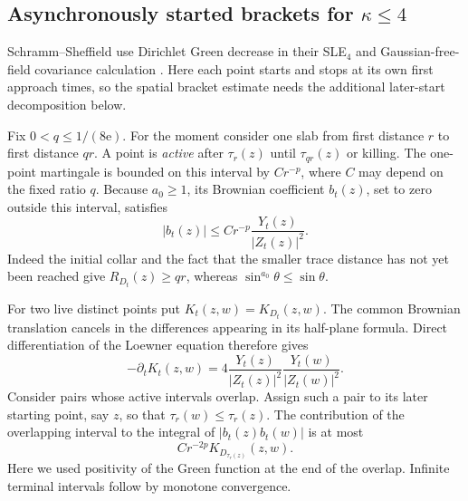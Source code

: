 \subsection{Asynchronously started brackets for
\texorpdfstring{$\kappa\le4$}{kappa at most four}}

Schramm--Sheffield use Dirichlet Green decrease in their SLE$_4$
and Gaussian-free-field covariance calculation
\cite[Lemmas~2.5--2.6]{schrammsheffield2013}.
Here each point starts and stops at its own first approach times, so
the spatial bracket estimate needs the additional later-start
decomposition below.

Fix $0<q\le1/(8\mathrm e)$.  For the moment consider one
slab from first distance $r$ to first distance $qr$.  A point is
\emph{active} after $\tau_r(z)$ until $\tau_{qr}(z)$ or killing.  The
one-point martingale is bounded on this interval by $C r^{-p}$, where
$C$ may depend on the fixed ratio $q$.  Because $a_0\ge1$, its Brownian
coefficient $b_t(z)$, set to zero outside this interval, satisfies
\begin{equation}
 |b_t(z)|\le C r^{-p}\frac{Y_t(z)}{|Z_t(z)|^2}.
 \label{mesh:active-coefficient}
\end{equation}
Indeed the initial collar and the fact that the smaller trace
distance has not yet been reached give $R_{D_t}(z)\ge qr$, whereas
$\sin^{a_0}\theta\le\sin\theta$.

For two live distinct points put $K_t(z,w)=K_{D_t}(z,w)$.  The common
Brownian translation cancels in the differences appearing in its
half-plane formula.  Direct differentiation of the Loewner equation
therefore gives
\begin{equation}
 -\partial_tK_t(z,w)
 =4\frac{Y_t(z)}{|Z_t(z)|^2}\frac{Y_t(w)}{|Z_t(w)|^2}.
 \label{mesh:green-decrease}
\end{equation}
Consider pairs whose active intervals overlap.  Assign such a pair to
its later starting point, say $z$, so that
$\tau_r(w)\le\tau_r(z)$.  The contribution of the overlapping
interval to the integral of $|b_t(z)b_t(w)|$ is at most
\begin{equation}
 Cr^{-2p}K_{D_{\tau_r(z)}}(z,w).
 \label{mesh:pair-bound}
\end{equation}
Here we used positivity of the Green function at the end of the
overlap.  Infinite terminal intervals follow by monotone convergence.

